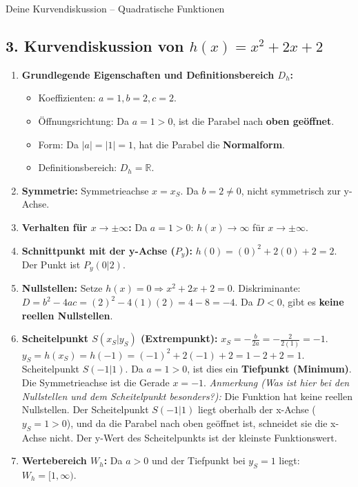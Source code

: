 \begin{loesungsumgebung}{Deine Kurvendiskussion – Quadratische Funktionen}
\subsection*{3. Kurvendiskussion von $h(x) = x^2 + 2x + 2$}
\begin{enumerate}[label=(\alph*)]
    \item \textbf{Grundlegende Eigenschaften und Definitionsbereich $D_h$:}
    \begin{itemize}
        \item Koeffizienten: $a=1, b=2, c=2$.
        \item Öffnungsrichtung: Da $a=1 > 0$, ist die Parabel nach \textbf{oben geöffnet}.
        \item Form: Da $|a|=|1|=1$, hat die Parabel die \textbf{Normalform}.
        \item Definitionsbereich: $D_h = \mathbb{R}$.
    \end{itemize}
    \item \textbf{Symmetrie:}
    Symmetrieachse $x = x_S$. Da $b=2 \neq 0$, nicht symmetrisch zur y-Achse.
    \item \textbf{Verhalten für $x \to \pm \infty$:}
    Da $a=1 > 0$: $h(x) \to \infty$ für $x \to \pm \infty$.
    \item \textbf{Schnittpunkt mit der y-Achse ($P_y$):}
    $h(0) = (0)^2 + 2(0) + 2 = 2$. Der Punkt ist $P_y(0|2)$.
    \item \textbf{Nullstellen:}
    Setze $h(x)=0 \Rightarrow x^2 + 2x + 2 = 0$.
    Diskriminante: $D = b^2 - 4ac = (2)^2 - 4(1)(2) = 4 - 8 = -4$.
    Da $D < 0$, gibt es \textbf{keine reellen Nullstellen}.
    \item \textbf{Scheitelpunkt $S(x_S|y_S)$ (Extrempunkt):}
    $x_S = -\frac{b}{2a} = -\frac{2}{2(1)} = -1$.
    $y_S = h(x_S) = h(-1) = (-1)^2 + 2(-1) + 2 = 1 - 2 + 2 = 1$.
    Scheitelpunkt $S(-1|1)$. Da $a=1 > 0$, ist dies ein \textbf{Tiefpunkt (Minimum)}.
    Die Symmetrieachse ist die Gerade $x=-1$.
    \textit{Anmerkung (Was ist hier bei den Nullstellen und dem Scheitelpunkt besonders?):} Die Funktion hat keine reellen Nullstellen. Der Scheitelpunkt $S(-1|1)$ liegt oberhalb der x-Achse ($y_S=1 > 0$), und da die Parabel nach oben geöffnet ist, schneidet sie die x-Achse nicht. Der y-Wert des Scheitelpunkts ist der kleinste Funktionswert.
    \item \textbf{Wertebereich $W_h$:}
    Da $a>0$ und der Tiefpunkt bei $y_S=1$ liegt: $W_h = [1, \infty)$.
\end{enumerate}


\end{loesungsumgebung}

